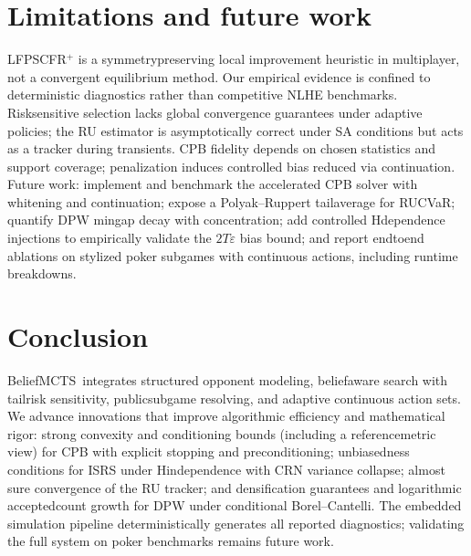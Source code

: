 \section{Limitations and future work}
LF\textendash PS\textendash CFR$^+$ is a symmetry\textendash preserving local improvement heuristic in multiplayer, not a convergent equilibrium method. Our empirical evidence is confined to deterministic diagnostics rather than competitive NLHE benchmarks. Risk\textendash sensitive selection lacks global convergence guarantees under adaptive policies; the RU estimator is asymptotically correct under SA conditions but acts as a tracker during transients. CPB fidelity depends on chosen statistics and support coverage; penalization induces controlled bias reduced via continuation. Future work: implement and benchmark the accelerated CPB solver with whitening and continuation; expose a Polyak–Ruppert tail\textendash average for RU\textendash CVaR; quantify DPW min\textendash gap decay with concentration; add controlled H\textendash dependence injections to empirically validate the $2T\varepsilon$ bias bound; and report end\textendash to\textendash end ablations on stylized poker subgames with continuous actions, including runtime breakdowns.

\section{Conclusion}
Belief\textendash MCTS\textendash \sCRF\ integrates structured opponent modeling, belief\textendash aware search with tail\textendash risk sensitivity, public\textendash subgame re\textendash solving, and adaptive continuous action sets. We advance innovations that improve algorithmic efficiency and mathematical rigor: strong convexity and conditioning bounds (including a reference\textendash metric view) for CPB with explicit stopping and preconditioning; unbiasedness conditions for IS\textendash RS under H\textendash independence with CRN variance collapse; almost sure convergence of the RU tracker; and densification guarantees and logarithmic accepted\textendash count growth for DPW under conditional Borel–Cantelli. The embedded simulation pipeline deterministically generates all reported diagnostics; validating the full system on poker benchmarks remains future work.

